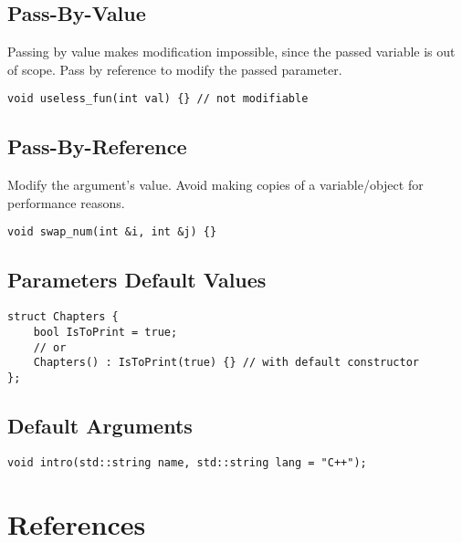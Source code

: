 \subsection{Pass-By-Value}

Passing by value makes modification impossible, since the passed variable is out of scope.
Pass by reference to modify the passed parameter.

\begin{verbatim}
void useless_fun(int val) {} // not modifiable
\end{verbatim}

\subsection{Pass-By-Reference}

Modify the argument's value.
Avoid making copies of a variable/object for performance reasons.

\begin{verbatim}
void swap_num(int &i, int &j) {}
\end{verbatim}

\subsection{Parameters Default Values}

\begin{verbatim}
struct Chapters {
    bool IsToPrint = true;
    // or
    Chapters() : IsToPrint(true) {} // with default constructor
};
\end{verbatim}

\subsection{Default Arguments}

\begin{verbatim}
void intro(std::string name, std::string lang = "C++");
\end{verbatim}

\section{References}

